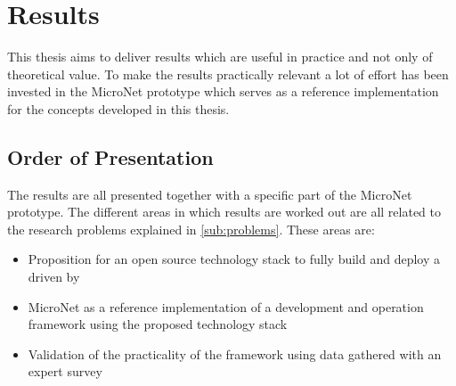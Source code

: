\chapter{Results}

This thesis aims to deliver results which are useful in practice and not only
of theoretical value. To make the results practically relevant a lot of effort
has been invested in the MicroNet prototype which serves as a reference
implementation for the concepts developed in this thesis.

\section{Order of Presentation}

The results are all presented together with a specific part of the MicroNet
prototype. The different areas in which results are worked out are all related
to the research problems explained in \autoref{sub:problems}. These areas are:

\begin{itemize}
  \item Proposition for an  open source technology stack to fully build and
  deploy a \og{} driven by \mss{}
  \item MicroNet as a reference implementation of a \ms{} \og{} development and
  operation framework using the proposed technology stack
  \item Validation of the practicality of the framework using data gathered with
  an expert survey 
\end{itemize}



